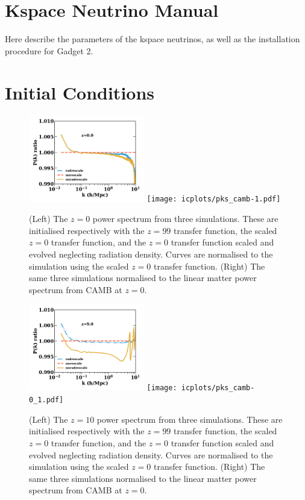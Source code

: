 \documentclass[useAMS, usenatbib]{mnras}
\begin{document}
\section{Kspace Neutrino Manual}
\label{sec:manual}

Here describe the parameters of the kspace neutrinos,
as well as the installation procedure for Gadget 2.

\section{Initial Conditions}
\label{sec:initcond}

\begin{figure}
\includegraphics[width=0.45\textwidth]{icplots/pks_rel-1.pdf}
\texttt{[image: icplots/pks\_camb-1.pdf]}
  \caption{(Left) The $z=0$ power spectrum from three simulations.
  These are initialised respectively with the $z=99$ transfer function,
  the scaled $z=0$ transfer function, and the $z=0$ transfer function
  scaled and evolved neglecting radiation density.
  Curves are normalised to the simulation using the scaled $z=0$ transfer function.
  (Right) The same three simulations normalised to the linear matter
  power spectrum from CAMB at $z=0$.}
  \label{fig:rescaling0}
\end{figure}

\begin{figure}
\includegraphics[width=0.45\textwidth]{icplots/pks_rel-0_1.pdf}
\texttt{[image: icplots/pks\_camb-0\_1.pdf]}
  \caption{(Left) The $z=10$ power spectrum from three simulations.
  These are initialised respectively with the $z=99$ transfer function,
  the scaled $z=0$ transfer function, and the $z=0$ transfer function
  scaled and evolved neglecting radiation density.
  Curves are normalised to the simulation using the scaled $z=0$ transfer function.
  (Right) The same three simulations normalised to the linear matter
  power spectrum from CAMB at $z=0$.}
  \label{fig:rescaling10}
\end{figure}
\end{document}
